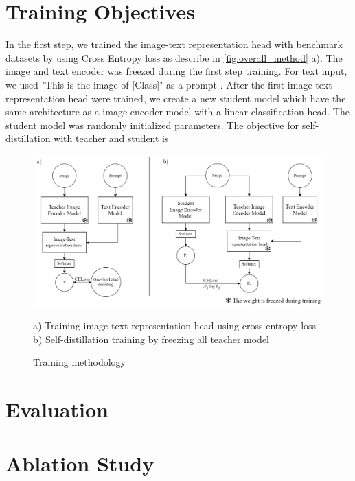 \section{Training Objectives}
In the first step, we trained the image-text representation head with benchmark datasets by using Cross Entropy loss as describe in \ref{fig:overall_method} a). The image and text encoder was freezed during the first step training. For text input, we used "This is the image of [Class]" as a prompt . After the first image-text representation head were trained, we create a new student model which have the same architecture as a image encoder model with a linear classification head. The student model was randomly initialized parameters. The objective for self-distillation with teacher and student is  

\begin{figure}[h]
\caption{Training methodology}
\label{fig:methodology}
\begin{center}
\includegraphics[width=1\textwidth]{Images/Methodology.png}
\end{center}
\small a) Training image-text representation head using cross entropy loss b) Self-distillation training by freezing all teacher model
\end{figure}

\section{Evaluation}
\section{Ablation Study}

